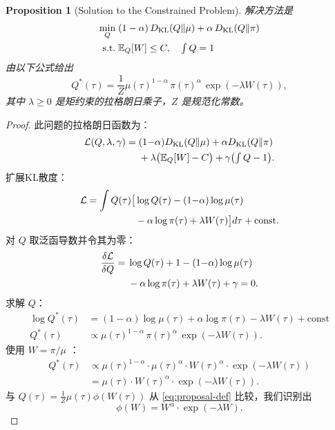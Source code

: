 \documentclass{article}
\theoremstyle{plain}
\newtheorem{proposition}[theorem]{Proposition}
\theoremstyle{definition}
\theoremstyle{remark}
\begin{document}
\begin{proposition}[Solution to the Constrained Problem]
  \label{prop:proposal-solution}
  解决方法是
  \begin{align}
    \min_{Q} \;    & (1-\alpha) \, D_{\mathrm{KL}}(Q \| \mu) + \alpha \, D_{\mathrm{KL}}(Q \| \pi) \notag \\
    \text{s.t.} \; & \mathbb{E}_{Q}[W] \leq C, \quad \textstyle\int Q = 1
  \end{align}
  由以下公式给出
  \begin{equation}
    Q^*(\tau) = \frac{1}{Z} \mu(\tau)^{1-\alpha} \, \pi(\tau)^{\alpha} \, \exp(-\lambda W(\tau)),
  \end{equation}
  其中 $\lambda \geq 0$ 是矩约束的拉格朗日乘子，$Z$ 是规范化常数。
\end{proposition}

\begin{proof}
  此问题的拉格朗日函数为：
  \begin{align}
    \mathcal{L}(Q, \lambda, \gamma) = \; & (1{-}\alpha) D_{\mathrm{KL}}(Q \| \mu) + \alpha D_{\mathrm{KL}}(Q \| \pi) \notag     \\
                                         & + \lambda \bigl(\mathbb{E}_Q[W] - C\bigr) + \gamma \bigl(\textstyle\int Q - 1\bigr).
  \end{align}
  扩展KL散度：
  \begin{align}
    \mathcal{L} = \int Q(\tau) \bigl[ & \log Q(\tau) - (1{-}\alpha) \log \mu(\tau) \notag                      \\
                                      & - \alpha \log \pi(\tau) + \lambda W(\tau) \bigr] d\tau + \text{const}.
  \end{align}
  对 $Q$ 取泛函导数并令其为零：
  \begin{align}
    \frac{\delta \mathcal{L}}{\delta Q} = \; & \log Q(\tau) + 1 - (1{-}\alpha) \log \mu(\tau) \notag   \\
                                             & - \alpha \log \pi(\tau) + \lambda W(\tau) + \gamma = 0.
  \end{align}
  求解 $Q$：
  \begin{align}
    \log Q^*(\tau) & = (1{-}\alpha) \log \mu(\tau) + \alpha \log \pi(\tau) - \lambda W(\tau) + \text{const} \\
    Q^*(\tau)      & \propto \mu(\tau)^{1-\alpha} \, \pi(\tau)^{\alpha} \, \exp(-\lambda W(\tau)).
  \end{align}
  使用 $W = \pi/\mu$ ：
  \begin{align}
    Q^*(\tau) & \propto \mu(\tau)^{1-\alpha} \cdot \mu(\tau)^{\alpha} \cdot W(\tau)^{\alpha} \cdot \exp(-\lambda W(\tau)) \\
              & = \mu(\tau) \cdot W(\tau)^{\alpha} \cdot \exp(-\lambda W(\tau)).
  \end{align}
  与 $Q(\tau) = \frac{1}{Z} \mu(\tau) \phi(W(\tau))$ 从 \cref{eq:proposal-def} 比较，我们识别出
  \begin{equation}
    \phi(W) = W^{\alpha} \cdot \exp(-\lambda W).
  \end{equation}
\end{proof}
\end{document}
